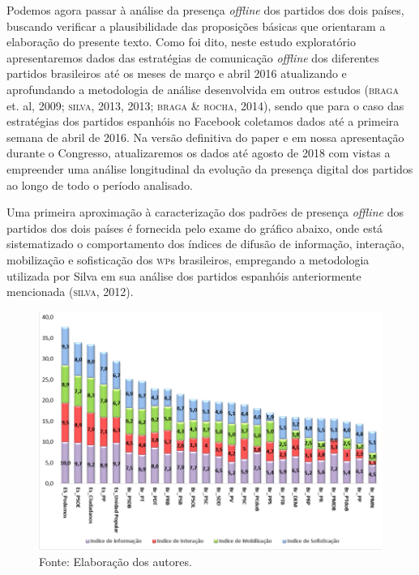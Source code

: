 \noindent{}Podemos agora passar à análise da presença \emph{offline} dos partidos dos dois
países, buscando verificar a plausibilidade das proposições básicas que
orientaram a elaboração do presente texto. Como foi dito, neste estudo
exploratório apresentaremos dados das estratégias de comunicação \emph{offline}
dos diferentes partidos brasileiros até os meses de março e abril 2016
atualizando e aprofundando a metodologia de análise desenvolvida em
outros estudos (\textsc{braga} et. al, 2009; \textsc{silva}, 2013, 2013; \textsc{braga} \& \textsc{rocha},
2014), sendo que para o caso das estratégias dos partidos espanhóis no
Facebook coletamos dados até a primeira semana de abril de 2016. Na
versão definitiva do paper e em nossa apresentação durante o Congresso,
atualizaremos os dados até agosto de 2018 com vistas a empreender uma
análise longitudinal da evolução da presença digital dos partidos ao
longo de todo o período analisado.

Uma primeira aproximação à caracterização dos padrões de presença
\emph{offline} dos partidos dos dois países é fornecida pelo exame do gráfico
abaixo, onde está sistematizado o comportamento dos índices de difusão
de informação, interação, mobilização e sofisticação dos \textsc{wp}s
brasileiros, empregando a metodologia utilizada por Silva em sua análise
dos partidos espanhóis anteriormente mencionada (\textsc{silva}, 2012).

\pagebreak

\begin{center}
\end{center}

\begin{figure}[!ht]
\centering
 \includegraphics[width=\textwidth]{./imgs/graf1.png}
\caption{Fonte: Elaboração dos autores.}
\end{figure}


